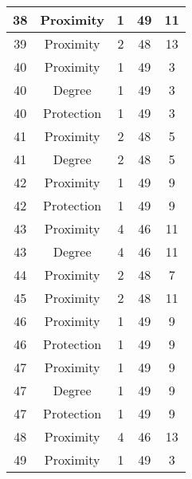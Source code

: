 \documentclass[results.tex]{subfiles}
\begin{document}
\begin{center}
\begin{tabular}{| c || c | c | c | c |}
    \hline
    38 & Proximity & 1 & 49 & 11 \\ 
    \hline
    39 & Proximity & 2 & 48 & 13 \\ 
    \hline
    40 & Proximity & 1 & 49 & 3 \\ 
    \hline
    40 & Degree & 1 & 49 & 3 \\ 
    \hline
    40 & Protection & 1 & 49 & 3 \\ 
    \hline
    41 & Proximity & 2 & 48 & 5 \\ 
    \hline
    41 & Degree & 2 & 48 & 5 \\ 
    \hline
    42 & Proximity & 1 & 49 & 9 \\ 
    \hline
    42 & Protection & 1 & 49 & 9 \\ 
    \hline
    43 & Proximity & 4 & 46 & 11 \\ 
    \hline
    43 & Degree & 4 & 46 & 11 \\ 
    \hline
    44 & Proximity & 2 & 48 & 7 \\ 
    \hline
    45 & Proximity & 2 & 48 & 11 \\ 
    \hline
    46 & Proximity & 1 & 49 & 9 \\ 
    \hline
    46 & Protection & 1 & 49 & 9 \\ 
    \hline
    47 & Proximity & 1 & 49 & 9 \\ 
    \hline
    47 & Degree & 1 & 49 & 9 \\ 
    \hline
    47 & Protection & 1 & 49 & 9 \\ 
    \hline
    48 & Proximity & 4 & 46 & 13 \\ 
    \hline
    49 & Proximity & 1 & 49 & 3 \\ 
    \hline   \end{tabular}
\end{center}
\end{document}
